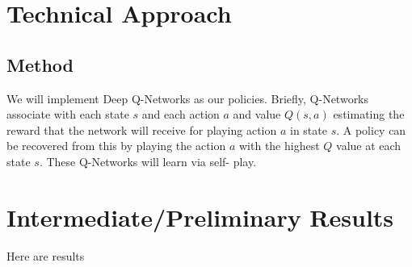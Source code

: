 \documentclass[10pt,twocolumn,letterpaper]{article}
\begin{document}
\section{Technical Approach}

\subsection{Method} We will implement Deep Q-Networks as our policies. Briefly,
Q-Networks associate with each state $s$ and each action $a$ and value $Q(s, a)$
estimating the reward that the network will receive for playing action $a$ in
state $s$. A policy can be recovered from this by playing the action $a$ with
the highest $Q$ value at each state $s$. These Q-Networks will learn via self-
play.

\section{Intermediate/Preliminary Results}

Here are results



{\small


}
\end{document}
